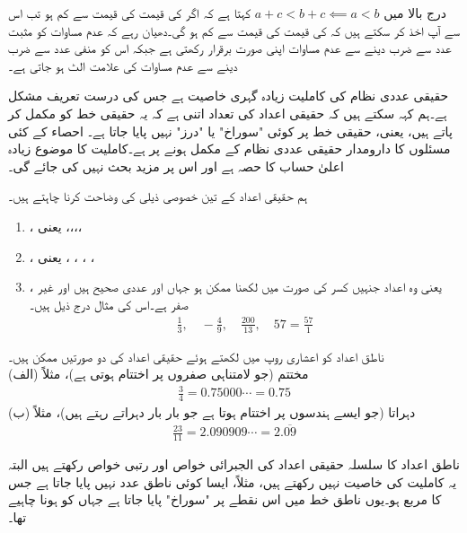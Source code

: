 درج بالا میں $a+c<b+c\impliedby a<b$ کہتا ہے کہ اگر  کی قیمت  کی قیمت سے کم ہو تب اس سے آپ اخذ کر سکتے ہیں کہ  کی قیمت  کی قیمت سے کم ہو گی۔دھیان رہے کہ عدم مساوات کو مثبت عدد سے ضرب دینے سے عدم مساوات اپنی صورت برقرار رکھتی ہے جبکہ اس کو منفی عدد سے ضرب دینے سے عدم مساوات کی علامت الٹ ہو جاتی ہے۔ 

حقیقی عددی نظام کی کاملیت زیادہ گہری خاصیت ہے جس کی درست تعریف مشکل ہے۔ہم کہہ سکتے ہیں کہ حقیقی اعداد کی تعداد اتنی ہے کہ یہ حقیقی خط کو مکمل کر پاتے ہیں، یعنی، حقیقی خط پر کوئی "سوراخ" یا "درز" نہیں پایا جاتا ہے۔ احصاء کے کئی مسئلوں کا دارومدار حقیقی عددی نظام کے مکمل ہونے پر ہے۔کاملیت کا موضوع زیادہ اعلیٰ  حساب کا حصہ ہے اور اس پر مزید بحث نہیں کی جائے گی۔  

ہم حقیقی اعداد کے تین خصوصی ذیلی  کی وضاحت کرنا چاہتے ہیں۔
\begin{enumerate}[1.]
\item
{}، یعنی ،،،،
\item
{}، یعنی ، ، ، ،
\item
{}، یعنی وہ اعداد جنہیں کسر  کی صورت میں لکھنا ممکن ہو جہاں  اور  عددی صحیح ہیں اور  غیر صفر  ہے۔اس کی مثال درج ذیل ہیں۔
\begin{align*}
\frac{1}{3},\quad -\frac{4}{9},\quad \frac{200}{13}, \quad 57=\frac{57}{1}
\end{align*} 
\end{enumerate}
ناطق اعداد کو اعشاری روپ میں لکھتے ہوئے حقیقی اعداد کی دو صورتیں ممکن ہیں۔\\
(الف) \quad
مختتم (جو لامتناہی صفروں پر اختتام ہوتی ہے)، مثلاً
\begin{align*}
\frac{3}{4}=0.75000\cdots=0.75
\end{align*}
(ب)\quad
دہراتا (جو ایسے ہندسوں پر اختتام ہوتا ہے جو بار بار دہراتے رہتے ہیں)، مثلاً
\begin{align*}
\frac{23}{11}=2.090909\cdots=2.\overline{09}
\end{align*}

ناطق اعداد  کا سلسلہ حقیقی اعداد کی  الجبرائی خواص اور رتبی خواص  رکھتے ہیں البتہ یہ کاملیت کی خاصیت نہیں رکھتے ہیں، مثلاً، ایسا کوئی ناطق عدد نہیں پایا جاتا ہے جس کا مربع  ہو۔یوں ناطق خط میں اس نقطے پر "سوراخ" پایا جاتا ہے جہاں  کو ہونا چاہیے تھا۔

